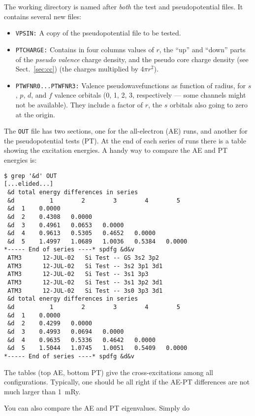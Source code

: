 \documentclass[11pt]{article}
\begin{document}
The working directory is named after {\sl both} the test and
pseudopotential files. It contains several new files:

\begin{itemize}
\item {\tt VPSIN:} A copy of the pseudopotential file to be tested.
\item  {\tt PTCHARGE:} Contains in four
columns values of $r$, the ``up'' and ``down'' parts of the {\sl
pseudo valence} charge density, and the pseudo core charge density
(see Sect.~\ref{sec:cc}) (the charges
multiplied by $4\pi r^2$).

\item {\tt PTWFNR0...PTWFNR3:} Valence pseudowavefunctions as function
of radius, for $s$, $p$, $d$, and $f$ valence orbitals (0, 1, 2, 3,
respectively --- some channels might not be available). They include 
a factor of $r$, the $s$ orbitals also going to zero at the origin.

\end{itemize}

The {\tt OUT} file has two sections, one for the all-electron (AE) runs, and
another for the pseudopotential tests (PT). At the end of each series
of runs there is a table showing the excitation energies. A handy way
to compare the AE and PT energies is:
\begin{verbatim}
$ grep '&d' OUT
[...elided...]
 &d total energy differences in series
 &d          1        2        3        4        5
 &d  1    0.0000
 &d  2    0.4308   0.0000
 &d  3    0.4961   0.0653   0.0000
 &d  4    0.9613   0.5305   0.4652   0.0000
 &d  5    1.4997   1.0689   1.0036   0.5384   0.0000
*----- End of series ----* spdfg &d&v
 ATM3      12-JUL-02   Si Test -- GS 3s2 3p2
 ATM3      12-JUL-02   Si Test -- 3s2 3p1 3d1
 ATM3      12-JUL-02   Si Test -- 3s1 3p3
 ATM3      12-JUL-02   Si Test -- 3s1 3p2 3d1
 ATM3      12-JUL-02   Si Test -- 3s0 3p3 3d1
 &d total energy differences in series
 &d          1        2        3        4        5
 &d  1    0.0000
 &d  2    0.4299   0.0000
 &d  3    0.4993   0.0694   0.0000
 &d  4    0.9635   0.5336   0.4642   0.0000
 &d  5    1.5044   1.0745   1.0051   0.5409   0.0000
*----- End of series ----* spdfg &d&v
\end{verbatim}

The tables (top AE, bottom PT) give the cross-excitations among all
configurations. Typically, one should be all right if the AE-PT
differences are not much larger than 1~mRy.

You can also compare the AE and PT eigenvalues. Simply do
\end{document}
